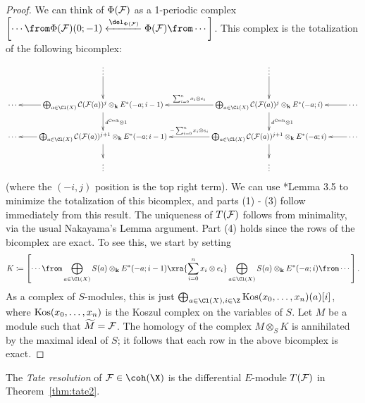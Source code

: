 \documentclass{amsart}
\begin{document}
\begin{proof}
We can think of $\Phi(\mathcal{F})$ as a 1-periodic complex
$\left[\cdots \from \Phi(\F)(0;-1) \xla{\del_{\Phi(\F)}} \Phi(\F) \from \cdots \right]$. This complex is the totalization of the following bicomplex:
$$
\xymatrix{
& \vdots \ar[d] && \vdots \ar[d] & \\
\cdots & \ar[l] \bigoplus_{a \in \Cl(X)} \cC(\F(a))^j \otimes_\k E^*(-a; i-1) \ar[d]^-{d^{\text{\v{C}ech}} \otimes 1}&& \ar[ll]_-{\sum_{i = 0}^n x_i \otimes e_i} \ar[d]^-{d^{\text{\v{C}ech}} \otimes 1} \bigoplus_{a \in \Cl(X)} \cC(\F(a))^j \otimes_\k E^*(-a; i) & \ar[l] \cdots \\
\cdots & \ar[l] \bigoplus_{a \in \Cl(X)} \cC(\F(a))^{j+1} \otimes_\k E^*(-a; i-1) \ar[d]  && \ar[ll]_-{-\sum_{i = 0}^n x_i \otimes e_i} \bigoplus_{a \in \Cl(X)} \cC(\F(a))^{j+1} \otimes_\k E^*(-a; i ) \ar[d] & \ar[l] \cdots  \\
 & \vdots && \vdots &
}
$$
(where the $(-i, j)$ position is the top right term). We can use \cite{EFS03}*{Lemma 3.5} to minimize the totalization of this bicomplex, and parts (1) - (3) follow immediately from this result. The uniqueness of $T(\mathcal{F})$ follows from minimality, via the usual Nakayama's Lemma argument. Part (4) holds since the rows of the bicomplex are exact. To see this, we start by setting
$$
K \ce \left[
\cdots \from \bigoplus_{a \in \Cl(X)} S(a) \otimes_\k E^*(-a;i-1) \xra{\sum_{i = 0}^n x_i \otimes e_i} \bigoplus_{a \in \Cl(X)} S(a) \otimes_\k E^*(-a;i) \from \cdots
\right].
$$
As a complex of $S$-modules, this is just $\bigoplus_{a \in \Cl(X), i \in \Z} \on{Kos}(x_0,\dots,x_n)(a)[i]$, where $\operatorname{Kos}(x_0,\dots,x_n)$ is the Koszul complex on the variables of $S$. Let $M$ be a module such that $\widetilde{M} = \mathcal{F}$. The homology of the complex $M \otimes_S K$ is annihilated by the maximal ideal of $S$; it follows that each row in the above bicomplex is exact.
\end{proof}

\begin{defn}
\label{defn:torictate}
The \emph{Tate resolution} of $\F \in \coh(\X)$ is the differential $E$-module $T(\mathcal{F})$ in Theorem~\ref{thm:tate2}.
\end{defn}
\end{document}
